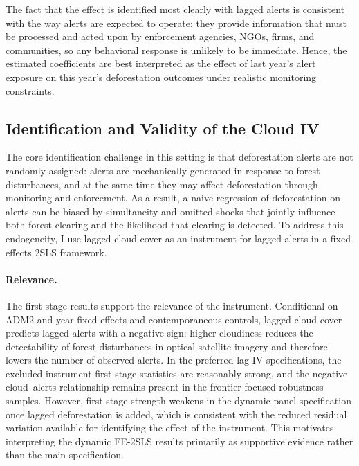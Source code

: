 \documentclass[hidelinks,12pt]{article}
\begin{document}
The fact that the effect is identified most clearly with lagged alerts is consistent with the way alerts are expected to operate: they provide information that must be processed and acted upon by enforcement agencies, NGOs, firms, and communities, so any behavioral response is unlikely to be immediate. Hence, the estimated coefficients are best interpreted as the effect of last year's alert exposure on this year's deforestation outcomes under realistic monitoring constraints.

\subsection{Identification and Validity of the Cloud IV}
\label{sec:discussion_iv}

The core identification challenge in this setting is that deforestation alerts are not randomly assigned: alerts are mechanically generated in response to forest disturbances, and at the same time they may affect deforestation through monitoring and enforcement. As a result, a naive regression of deforestation on alerts can be biased by simultaneity and omitted shocks that jointly influence both forest clearing and the likelihood that clearing is detected. To address this endogeneity, I use lagged cloud cover as an instrument for lagged alerts in a fixed-effects 2SLS framework.

\paragraph{Relevance.}
The first-stage results support the relevance of the instrument. Conditional on ADM2 and year fixed effects and contemporaneous controls, lagged cloud cover predicts lagged alerts with a negative sign: higher cloudiness reduces the detectability of forest disturbances in optical satellite imagery and therefore lowers the number of observed alerts. In the preferred lag-IV specifications, the excluded-instrument first-stage statistics are reasonably strong, and the negative cloud--alerts relationship remains present in the frontier-focused robustness samples. However, first-stage strength weakens in the dynamic panel specification once lagged deforestation is added, which is consistent with the reduced residual variation available for identifying the effect of the instrument. This motivates interpreting the dynamic FE-2SLS results primarily as supportive evidence rather than the main specification.
\end{document}
